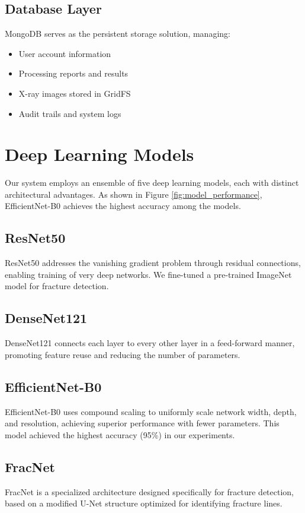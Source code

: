 \documentclass[conference]{IEEEtran}
\begin{document}
\subsection{Database Layer}
MongoDB serves as the persistent storage solution, managing:
\begin{itemize}
    \item User account information
    \item Processing reports and results
    \item X-ray images stored in GridFS
    \item Audit trails and system logs
\end{itemize}

\section{Deep Learning Models}
\label{sec:models}

Our system employs an ensemble of five deep learning models, each with distinct architectural advantages. As shown in Figure \ref{fig:model_performance}, EfficientNet-B0 achieves the highest accuracy among the models.

\subsection{ResNet50}
ResNet50 \cite{he2016deep} addresses the vanishing gradient problem through residual connections, enabling training of very deep networks. We fine-tuned a pre-trained ImageNet model for fracture detection.

\subsection{DenseNet121}
DenseNet121 \cite{huang2017densely} connects each layer to every other layer in a feed-forward manner, promoting feature reuse and reducing the number of parameters.

\subsection{EfficientNet-B0}
EfficientNet-B0 \cite{tan2019efficientnet} uses compound scaling to uniformly scale network width, depth, and resolution, achieving superior performance with fewer parameters. This model achieved the highest accuracy (95\%) in our experiments.

\subsection{FracNet}
FracNet is a specialized architecture designed specifically for fracture detection, based on a modified U-Net structure optimized for identifying fracture lines.
\end{document}
